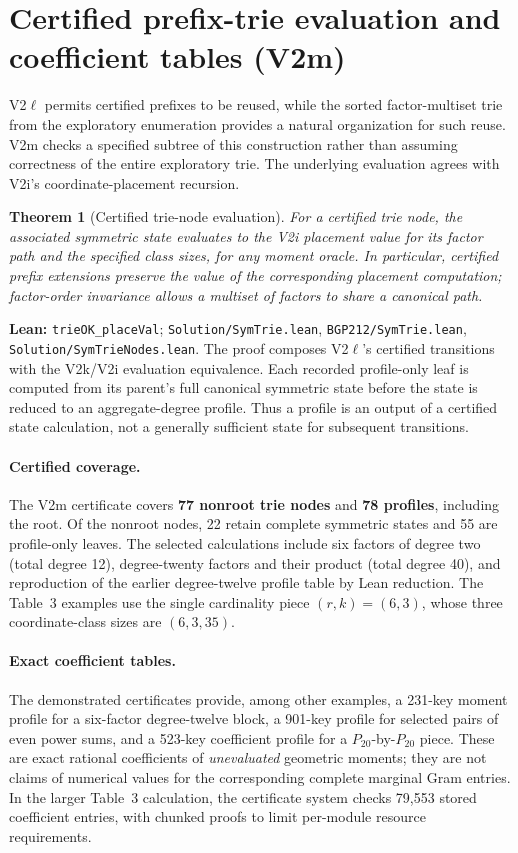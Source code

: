 \documentclass[11pt]{article}
\newtheorem{theorem}{Theorem}[section]
\newcommand{\code}[1]{\texttt{#1}}
\begin{document}
\section{Certified prefix-trie evaluation and coefficient tables (V2m)}\label{sec:v2m}
V2\ensuremath{\ell} permits certified prefixes to be reused, while the
sorted factor-multiset trie from the exploratory enumeration provides a
natural organization for such reuse. V2m checks a specified subtree of this
construction rather than assuming correctness of the entire exploratory trie.
The underlying evaluation agrees with V2i's coordinate-placement recursion.

\begin{theorem}[Certified trie-node evaluation]\label{thm:v2m-trie}
For a certified trie node, the associated symmetric state evaluates to the
V2i placement value for its factor path and the specified class sizes, for
any moment oracle. In particular, certified prefix extensions preserve the
value of the corresponding placement computation; factor-order invariance
allows a multiset of factors to share a canonical path.
\end{theorem}
\noindent\textbf{Lean:} \code{trieOK\_placeVal};
\nolinkurl{Solution/SymTrie.lean},
\nolinkurl{BGP212/SymTrie.lean},
\nolinkurl{Solution/SymTrieNodes.lean}.
The proof composes V2\ensuremath{\ell}'s certified transitions with the
V2k/V2i evaluation equivalence. Each recorded profile-only leaf is computed
from its parent's full canonical symmetric state before the state is reduced
to an aggregate-degree profile. Thus a profile is an output of a certified
state calculation, not a generally sufficient state for subsequent
transitions.

\paragraph{Certified coverage.}
The V2m certificate covers \textbf{77 nonroot trie nodes} and
\textbf{78 profiles}, including the root. Of the nonroot nodes,
22 retain complete symmetric states and 55 are profile-only leaves.
The selected calculations include six factors of degree two (total degree
12), degree-twenty factors and their product (total degree 40), and
reproduction of the earlier degree-twelve profile table by Lean reduction.
The Table~3 examples use the single cardinality piece $(r,k)=(6,3)$,
whose three coordinate-class sizes are $(6,3,35)$.

\paragraph{Exact coefficient tables.}
The demonstrated certificates provide, among other examples, a
231-key moment profile for a six-factor degree-twelve block, a
901-key profile for selected pairs of even power sums, and a
523-key coefficient profile for a $P_{20}$-by-$P_{20}$ piece.
These are exact rational coefficients of \emph{unevaluated} geometric
moments; they are not claims of numerical values for the corresponding
complete marginal Gram entries. In the larger Table~3 calculation, the
certificate system checks 79,553 stored coefficient entries, with chunked
proofs to limit per-module resource requirements.
\end{document}
